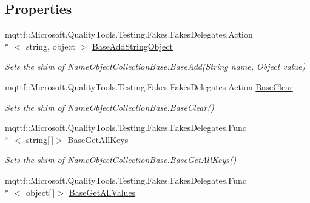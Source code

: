 \subsection*{Properties}
\begin{DoxyCompactItemize}
\item 
mqttf\-::\-Microsoft.\-Quality\-Tools.\-Testing.\-Fakes.\-Fakes\-Delegates.\-Action\\*
$<$ string, object $>$ \hyperlink{class_system_1_1_collections_1_1_specialized_1_1_fakes_1_1_shim_name_object_collection_base_a48749cd26178115aae126bad0716c685}{Base\-Add\-String\-Object}
\begin{DoxyCompactList}\small\item\em Sets the shim of Name\-Object\-Collection\-Base.\-Base\-Add(\-String name, Object value)\end{DoxyCompactList}\item 
mqttf\-::\-Microsoft.\-Quality\-Tools.\-Testing.\-Fakes.\-Fakes\-Delegates.\-Action \hyperlink{class_system_1_1_collections_1_1_specialized_1_1_fakes_1_1_shim_name_object_collection_base_a213c396baaed29d889e67bf84848fe2b}{Base\-Clear}
\begin{DoxyCompactList}\small\item\em Sets the shim of Name\-Object\-Collection\-Base.\-Base\-Clear()\end{DoxyCompactList}\item 
mqttf\-::\-Microsoft.\-Quality\-Tools.\-Testing.\-Fakes.\-Fakes\-Delegates.\-Func\\*
$<$ string\mbox{[}$\,$\mbox{]}$>$ \hyperlink{class_system_1_1_collections_1_1_specialized_1_1_fakes_1_1_shim_name_object_collection_base_a2d369cc6954fdb552a725d740a7a3f18}{Base\-Get\-All\-Keys}
\begin{DoxyCompactList}\small\item\em Sets the shim of Name\-Object\-Collection\-Base.\-Base\-Get\-All\-Keys()\end{DoxyCompactList}\item 
mqttf\-::\-Microsoft.\-Quality\-Tools.\-Testing.\-Fakes.\-Fakes\-Delegates.\-Func\\*
$<$ object\mbox{[}$\,$\mbox{]}$>$ \hyperlink{class_system_1_1_collections_1_1_specialized_1_1_fakes_1_1_shim_name_object_collection_base_a0a116cff160b42c06fc6e2b70d16a09b}{Base\-Get\-All\-Values}

\end{DoxyCompactItemize}
